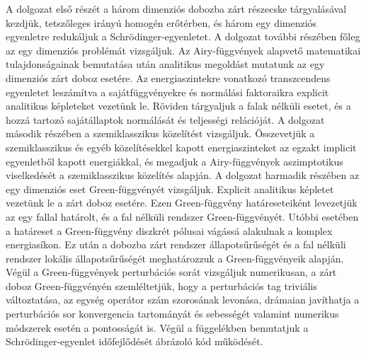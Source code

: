 A dolgozat első részét a három dimenziós dobozba zárt részecske tárgyalásával kezdjük, tetszőleges irányú homogén erőtérben, és három egy dimenziós egyenletre redukáljuk a Schrödinger-egyenletet. A dolgozat további részében főleg az egy dimenziós problémát vizsgáljuk. Az Airy-függvények alapvető matematikai tulajdonságainak bemutatása után analitikus megoldást mutatunk az egy dimenziós zárt doboz esetére. Az energiaszintekre vonatkozó transzcendens egyenletet leszámítva a sajátfüggvényekre és normálási faktoraikra explicit analitikus képleteket vezetünk le. Röviden tárgyaljuk a falak nélküli esetet, és a hozzá tartozó sajátállaptok normálását és teljességi relációját.
A dolgozat második részében a szemiklasszikus közelítést vizsgáljuk. Összevetjük a szemiklasszikus és egyéb közelítésekkel kapott energiaszinteket az egzakt implicit egyenletből kapott energiákkal, és megadjuk a Airy-függvények aszimptotikus viselkedését a szemiklasszikus közelítés alapján.
A dolgozat harmadik részében az egy dimenziós eset Green-függvényét vizsgáljuk. Explicit analitikus képletet vezetünk le a zárt doboz esetére. Ezen Green-függvény határeseteiként levezetjük az egy fallal határolt, és a fal nélküli rendszer Green-függvényét. Utóbbi esetében a határeset a Green-függvény diszkrét pólusai vágássá alakulnak a komplex energiasíkon. Ez után a dobozba zárt rendszer állapotsűrűségét és a fal nélküli rendszer lokális állapotsűrűségét meghatározzuk a Green-függvényeik alapján. Végül a Green-függvények perturbációs sorát vizsgáljuk numerikusan, a zárt doboz Green-függvényén szemléltetjük, hogy a perturbációs tag triviális változtatása, az egység operátor szám szorosának levonása, drámaian javíthatja a perturbációs sor konvergencia tartományát és sebességét valamint numerikus módszerek esetén a pontosságát is. Végül a függelékben bemutatjuk a Schrödinger-egyenlet időfejlődését ábrázoló kód működését.